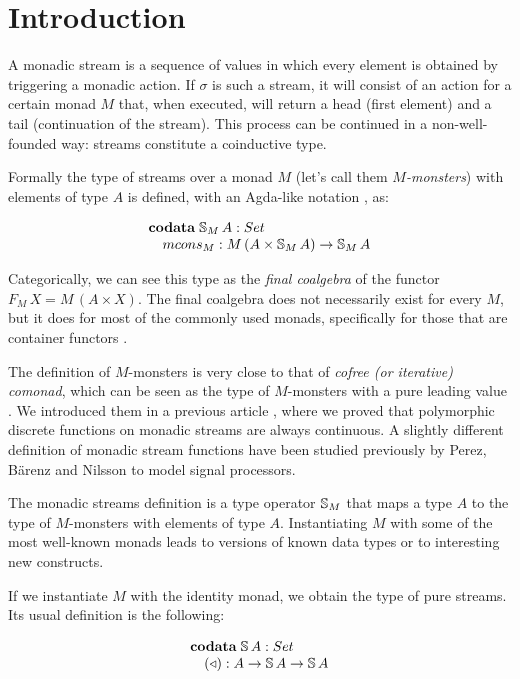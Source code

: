 \section{Introduction}

A monadic stream is a sequence of values in which every element is obtained by triggering a monadic action.
If $\sigma$ is such a stream, it will consist of an action for a certain monad $M$ that, when executed, will return a head (first element) and a tail (continuation of the stream).
This process can be continued in a non-well-founded way: streams constitute a coinductive type.

Formally the type of streams over a monad $M$ (let's call them {\em $M$-monsters}) with elements of type $A$ is defined, with an Agda-like notation \cite{agda}, as:

$$
\begin{array}[t]{l}
\codata\;
\stream{M}\,A:\set\\
\quad \mcons_M: M\,(A\times \stream{M}\,A)\rightarrow\stream{M}\,A
\end{array}
$$

Categorically, we can see this type as the {\em final coalgebra} of the functor $F_M\,X = M\,(A\times X)$.
The final coalgebra does not necessarily exist for every $M$, 
but it does for most of the commonly used monads, specifically for those that are container functors \cite{AAG:2005}.

The definition of $M$-monsters is very close to that of {\em cofree (or iterative) comonad}, which can be seen as the type of $M$-monsters with a pure 
leading value \cite{AAMV:2003,CUV:2006}.
We introduced them in a previous article \cite{capretta/fowler:2017}, where we proved that polymorphic discrete functions on monadic streams are always continuous.
A slightly different definition of monadic stream functions have been studied previously by Perez, B{\"{a}}renz and Nilsson \cite{PBN:2016} to model signal processors.


The monadic streams definition is a type operator $\mathbb{S}_{M}$ that maps a type $A$ to the type of $M$-monsters with elements of type $A$.
Instantiating $M$ with some of the most well-known monads leads to versions of known data types or to interesting new constructs.

If we instantiate $M$ with the identity monad, we obtain the type of pure streams.
Its usual definition is the following:

$$
\begin{array}[t]{l}
\codata\;
\strsym\,A:\set\\
\quad (\scons): A\rightarrow \strsym\,A \rightarrow\strsym\,A
\end{array}
$$


